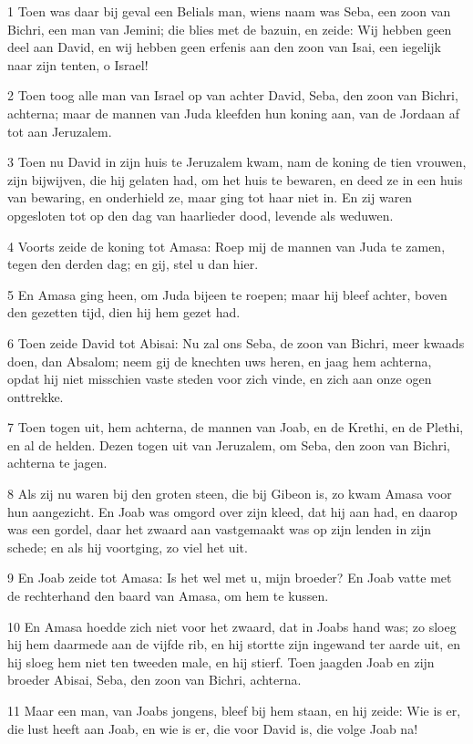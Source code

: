 \par 1 Toen was daar bij geval een Belials man, wiens naam was Seba, een zoon van Bichri, een man van Jemini; die blies met de bazuin, en zeide: Wij hebben geen deel aan David, en wij hebben geen erfenis aan den zoon van Isai, een iegelijk naar zijn tenten, o Israel!
\par 2 Toen toog alle man van Israel op van achter David, Seba, den zoon van Bichri, achterna; maar de mannen van Juda kleefden hun koning aan, van de Jordaan af tot aan Jeruzalem.
\par 3 Toen nu David in zijn huis te Jeruzalem kwam, nam de koning de tien vrouwen, zijn bijwijven, die hij gelaten had, om het huis te bewaren, en deed ze in een huis van bewaring, en onderhield ze, maar ging tot haar niet in. En zij waren opgesloten tot op den dag van haarlieder dood, levende als weduwen.
\par 4 Voorts zeide de koning tot Amasa: Roep mij de mannen van Juda te zamen, tegen den derden dag; en gij, stel u dan hier.
\par 5 En Amasa ging heen, om Juda bijeen te roepen; maar hij bleef achter, boven den gezetten tijd, dien hij hem gezet had.
\par 6 Toen zeide David tot Abisai: Nu zal ons Seba, de zoon van Bichri, meer kwaads doen, dan Absalom; neem gij de knechten uws heren, en jaag hem achterna, opdat hij niet misschien vaste steden voor zich vinde, en zich aan onze ogen onttrekke.
\par 7 Toen togen uit, hem achterna, de mannen van Joab, en de Krethi, en de Plethi, en al de helden. Dezen togen uit van Jeruzalem, om Seba, den zoon van Bichri, achterna te jagen.
\par 8 Als zij nu waren bij den groten steen, die bij Gibeon is, zo kwam Amasa voor hun aangezicht. En Joab was omgord over zijn kleed, dat hij aan had, en daarop was een gordel, daar het zwaard aan vastgemaakt was op zijn lenden in zijn schede; en als hij voortging, zo viel het uit.
\par 9 En Joab zeide tot Amasa: Is het wel met u, mijn broeder? En Joab vatte met de rechterhand den baard van Amasa, om hem te kussen.
\par 10 En Amasa hoedde zich niet voor het zwaard, dat in Joabs hand was; zo sloeg hij hem daarmede aan de vijfde rib, en hij stortte zijn ingewand ter aarde uit, en hij sloeg hem niet ten tweeden male, en hij stierf. Toen jaagden Joab en zijn broeder Abisai, Seba, den zoon van Bichri, achterna.
\par 11 Maar een man, van Joabs jongens, bleef bij hem staan, en hij zeide: Wie is er, die lust heeft aan Joab, en wie is er, die voor David is, die volge Joab na!
